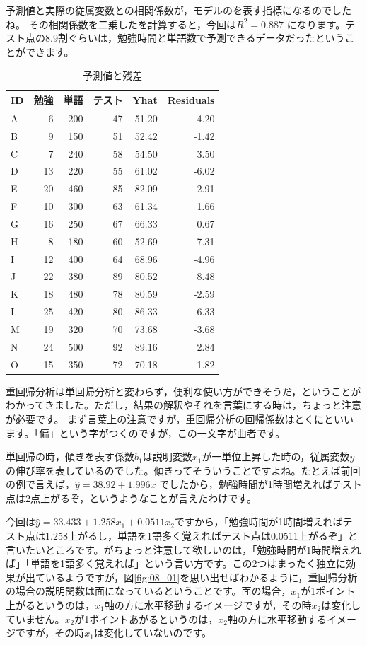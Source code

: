 \documentclass{ltjbook}
\begin{document}
予測値と実際の従属変数との相関係数が，モデルのを表す指標になるのでしたね。
その相関係数を二乗したを計算すると，今回は$R^2=0.887$ になります。テスト点の8.9割ぐらいは，勉強時間と単語数で予測できるデータだったということができます。
\begin{table}[ht]
	\caption{予測値と残差}
	\centering
	\begin{tabular}[t]{l|rrr|rr}
		\hline
		ID & 勉強 & 単語 & テスト & Yhat & Residuals \\
		\hline
		A & 6 & 200 & 47 & 51.20 & -4.20 \\
		B & 9 & 150 & 51 & 52.42 & -1.42 \\
		C & 7 & 240 & 58 & 54.50 & 3.50 \\
		D & 13 & 220 & 55 & 61.02 & -6.02 \\
		E & 20 & 460 & 85 & 82.09 & 2.91 \\
		F & 10 & 300 & 63 & 61.34 & 1.66 \\
		G & 16 & 250 & 67 & 66.33 & 0.67 \\
		H & 8 & 180 & 60 & 52.69 & 7.31 \\
		I & 12 & 400 & 64 & 68.96 & -4.96 \\
		J & 22 & 380 & 89 & 80.52 & 8.48 \\
		K & 18 & 480 & 78 & 80.59 & -2.59 \\
		L & 25 & 420 & 80 & 86.33 & -6.33 \\
		M & 19 & 320 & 70 & 73.68 & -3.68 \\
		N & 24 & 500 & 92 & 89.16 & 2.84 \\
		O & 15 & 350 & 72 & 70.18 & 1.82 \\
		\hline
	\end{tabular}
	\label{tbl:08_02}
\end{table}

重回帰分析は単回帰分析と変わらず，便利な使い方ができそうだ，ということがわかってきました。ただし，結果の解釈やそれを言葉にする時は，ちょっと注意が必要です。
まず言葉上の注意ですが，重回帰分析の回帰係数はとくにといいます。「偏」という字がつくのですが，この一文字が曲者です。

単回帰の時，傾きを表す係数$b_1$は説明変数$x_1$が一単位上昇した時の，従属変数$y$の伸び率を表しているのでした。傾きってそういうことですよね。たとえば前回の例で言えば，$\hat{y}=38.92+1.996x$ でしたから，勉強時間が1時間増えればテスト点は2点上がるぞ，というようなことが言えたわけです。

今回は$\hat{y}=33.433+1.258x_1+0.0511x_2$ですから，「勉強時間が1時間増えればテスト点は1.258上がるし，単語を1語多く覚えればテスト点は0.0511上がるぞ」と言いたいところです。がちょっと注意して欲しいのは，「勉強時間が1時間増えれば」「単語を1語多く覚えれば」という言い方です。この2つはまったく独立に効果が出ているようですが，図\ref{fig:08_01}を思い出せばわかるように，重回帰分析の場合の説明関数は面になっているということです。面の場合，$x_1$が1ポイント上がるというのは，$x_1$軸の方に水平移動するイメージですが，その時$x_2$は変化していません。$x_2$が1ポイントあがるというのは，$x_2$軸の方に水平移動するイメージですが，その時$x_1$は変化していないのです。
\end{document}
